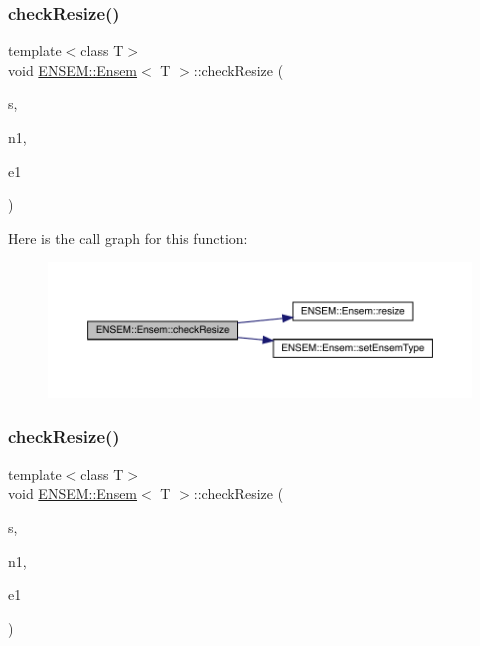 \subsubsection{\texorpdfstring{checkResize()}{checkResize()}\hspace{0.1cm}{\footnotesize\ttfamily [1/9]}}
{\footnotesize\ttfamily template$<$class T$>$ \\
void \mbox{\hyperlink{classENSEM_1_1Ensem}{E\+N\+S\+E\+M\+::\+Ensem}}$<$ T $>$\+::check\+Resize (\begin{DoxyParamCaption}\item[{const char $\ast$}]{s,  }\item[{int}]{n1,  }\item[{\mbox{\hyperlink{namespaceENSEM_a2dc2c4a26884f343471e52f23479ddbe}{Ensem\+Type\+\_\+t}}}]{e1 }\end{DoxyParamCaption})\hspace{0.3cm}{\ttfamily [inline]}}

Here is the call graph for this function\+:
\nopagebreak
\begin{figure}[H]
\begin{center}
\leavevmode
\includegraphics[width=350pt]{d7/d3e/classENSEM_1_1Ensem_a1cebe5f8cc3d849d6b4dc7d9d10c636b_cgraph}
\end{center}
\end{figure}
\mbox{\label{classENSEM_1_1Ensem_a1cebe5f8cc3d849d6b4dc7d9d10c636b}} 
\subsubsection{\texorpdfstring{checkResize()}{checkResize()}\hspace{0.1cm}{\footnotesize\ttfamily [2/9]}}
{\footnotesize\ttfamily template$<$class T$>$ \\
void \mbox{\hyperlink{classENSEM_1_1Ensem}{E\+N\+S\+E\+M\+::\+Ensem}}$<$ T $>$\+::check\+Resize (\begin{DoxyParamCaption}\item[{const char $\ast$}]{s,  }\item[{int}]{n1,  }\item[{\mbox{\hyperlink{namespaceENSEM_a2dc2c4a26884f343471e52f23479ddbe}{Ensem\+Type\+\_\+t}}}]{e1 }\end{DoxyParamCaption})\hspace{0.3cm}{\ttfamily [inline]}}

